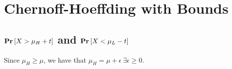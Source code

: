 \chapter{Chernoff-Hoeffding with Bounds}

\section{$\mathbf{Pr}\left[X > \mu_H+ t\right]$ and $\mathbf{Pr}\left[X < \mu_L - t\right]$}

Since $\mu_H \geq \mu$, we have that $\mu_H = \mu + \epsilon\ \exists \epsilon \geq 0$.
